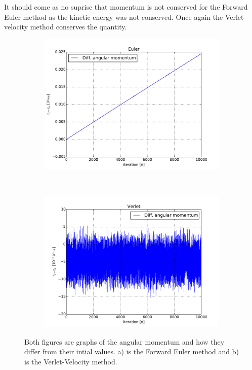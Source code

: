 It should come as no suprise that momentum is not conserved for the Forward Euler method as the kinetic energy was not conserved. Once again the Verlet-velocity method conserves the quantity. 



\begin{figure}[H]
    \centering
    \begin{subfigure}{0.5\textwidth}
        \centering
        \includegraphics[width=\linewidth]{result/bilder/ang-momentum-euler.pdf}
        \caption{}
    \end{subfigure}%
    ~ 
    \begin{subfigure}{0.5\textwidth}
        \centering
        \includegraphics[width=\linewidth]{result/bilder/ang-momentum-verlet.pdf}
        \caption{}
    \end{subfigure}
    \caption{Both figures are graphs of the angular momentum and how they differ from their intial values. a) is the Forward Euler method and b) is the Verlet-Velocity method. 
    }
    \label{fig:conserved-ang}
\end{figure}

